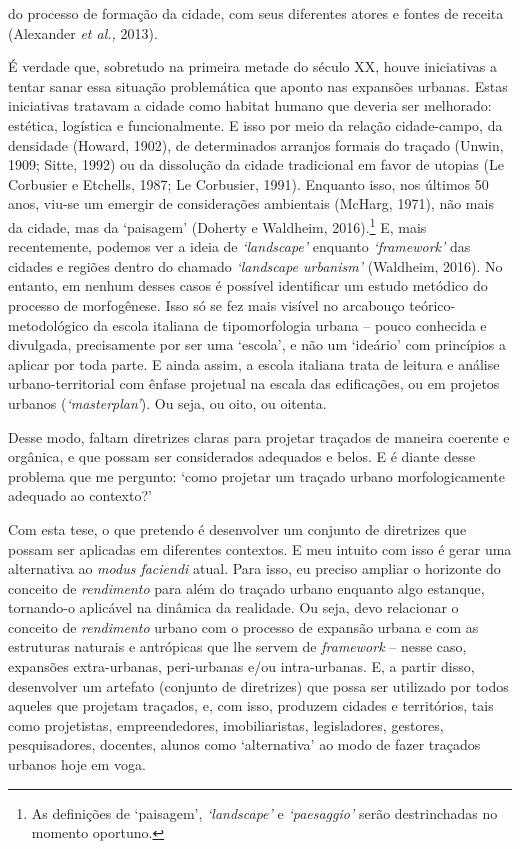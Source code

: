 \documentclass[12pt, a4paper]{book} %
\begin{document}
do processo de formação da cidade, com seus diferentes atores e fontes de receita (Alexander \textit{et al.,} 2013).

        É verdade que, sobretudo na primeira metade do século XX, houve iniciativas a tentar sanar essa situação problemática que aponto nas expansões urbanas. Estas iniciativas tratavam a cidade como habitat humano que deveria ser melhorado: estética, logística e funcionalmente. E isso por meio da relação cidade-campo, da densidade (Howard, 1902), de determinados arranjos formais do traçado (Unwin, 1909; Sitte, 1992) ou da dissolução da cidade tradicional em favor de utopias (Le Corbusier e Etchells, 1987; Le Corbusier, 1991). Enquanto isso, nos últimos 50 anos, viu-se um emergir de considerações ambientais (McHarg, 1971), não mais da cidade, mas da `paisagem' (Doherty e Waldheim, 2016).\footnote[5]{As definições de `paisagem', \textit{`landscape'} e \textit{`paesaggio'} serão destrinchadas no momento oportuno.} E, mais recentemente, podemos ver a ideia de \textit{`landscape'} enquanto \textit{`framework'} das cidades e regiões dentro do chamado \textit{`landscape urbanism'} (Waldheim, 2016). No entanto, em nenhum desses casos é possível identificar um estudo metódico do processo de morfogênese. Isso só se fez mais visível no arcabouço teórico-metodológico da escola italiana de tipomorfologia urbana – pouco conhecida e divulgada, precisamente por ser uma `escola', e não um `ideário' com princípios a aplicar por toda parte. E ainda assim, a escola italiana trata de leitura e análise urbano-territorial com ênfase projetual na escala das edificações, ou em projetos urbanos (\textit{`masterplan'}). Ou seja, ou oito, ou oitenta.
   
        Desse modo, faltam diretrizes claras para projetar traçados de maneira coerente e orgânica, e que possam ser considerados adequados e belos. E é diante desse problema que me pergunto: `como projetar um traçado urbano morfologicamente adequado ao contexto?' 

        Com esta tese, o que pretendo é desenvolver um conjunto de diretrizes que possam ser aplicadas em diferentes contextos. E meu intuito com isso é gerar uma alternativa ao \textit{modus faciendi} atual. Para isso, eu preciso ampliar o horizonte do conceito de \textit{rendimento} para além do traçado urbano enquanto algo estanque, tornando-o aplicável na dinâmica da realidade. Ou seja, devo relacionar o conceito de \textit{rendimento} urbano com o processo de expansão urbana e com as estruturas naturais e antrópicas que lhe servem de \textit{framework} – nesse caso, expansões extra-urbanas, peri-urbanas e/ou intra-urbanas. E, a partir disso, desenvolver um artefato (conjunto de diretrizes) que possa ser utilizado por todos aqueles que projetam traçados, e, com isso, produzem cidades e territórios, tais como projetistas, empreendedores, imobiliaristas, legisladores, gestores, pesquisadores, docentes, alunos como `alternativa' ao modo de fazer traçados urbanos hoje em voga.
\end{document}
